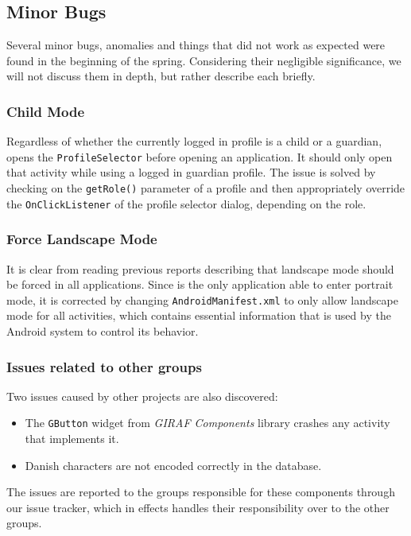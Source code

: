 \subsection{Minor Bugs}

Several minor bugs, anomalies and things that did not work as expected were found in the beginning of the spring.
Considering their negligible significance, we will not discuss them in depth, but rather describe each briefly.

\subsubsection{Child Mode}
Regardless of whether the currently logged in profile is a child or a guardian, \launcher opens the \lstinline{ProfileSelector} before opening an application.
It should only open that activity while using a logged in guardian profile.
The issue is solved by checking on the \lstinline{getRole()} parameter of a profile and then appropriately override the \lstinline{OnClickListener} of the profile selector dialog, depending on the role. 

\subsubsection{Force Landscape Mode}
It is clear from reading previous reports describing \launcher that landscape mode should be forced in all \giraf applications.
Since \launcher is the only application able to enter portrait mode, it is corrected by changing \lstinline{AndroidManifest.xml} to only allow landscape mode for all activities, which contains essential information that is used by the Android system to control its behavior\cite{appManifest}.

\subsubsection{Issues related to other groups}
Two issues caused by other projects are also discovered:

\begin{itemize}
\item The \lstinline{GButton} widget from \textit{GIRAF Components} library crashes any activity that implements it.
\item Danish characters are not encoded correctly in the database.
\end{itemize}

The issues are reported to the groups responsible for these components through our issue tracker, which in effects handles their responsibility over to the other groups.